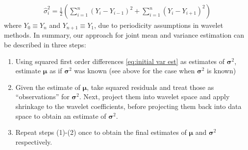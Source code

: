 \documentclass[12pt]{article}
\newcommand{\s}{\sigma}
\begin{document}
\begin{eqnarray}\label{eq:initial var est}
\hat{\s}_i^2=\frac{1}{2}\left(\sum_{i=1}^n(Y_i-Y_{i-1})^2+\sum_{i=1}^n(Y_i-Y_{i+1})^2\right)
\end{eqnarray}
where $Y_0\equiv Y_n$ and $Y_{n+1}\equiv Y_1$, due to periodicity assumptions in wavelet methods. In summary, our approach for joint mean and variance estimation can be described in three steps:
\begin{enumerate}
\item Using squared first order differences \eqref{eq:initial var est} as estimates of $\bm{\s}^2$, estimate $\bm{\mu}$ as if $\bm{\s}^2$ was known (see above for the case when $\bm{\s}^2$ is known)
\item Given the estimate of $\bm{\mu}$, take squared residuals and treat those as ``observations'' for $\bm{\s}^2$. Next, project them into wavelet space and apply shrinkage to the wavelet coefficients, before projecting them back into data space to obtain an estimate of $\bm{\s}^2$.
\item Repeat steps (1)-(2) once to obtain the final estimates of $\bm{\mu}$ and $\bm{\s}^2$ respectively.
\end{enumerate}
\end{document}
